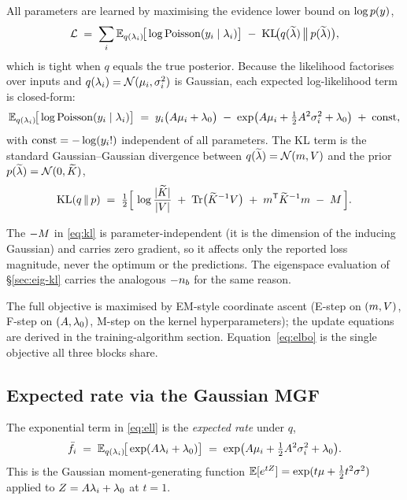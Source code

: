 All parameters are learned by maximising the evidence lower bound on
$\log p(y)$,
\begin{equation}
  \mathcal{L} \;=\; \sum_i \mathbb{E}_{q(\lambda_i)}\!\big[\log \mathrm{Poisson}(y_i\mid\lambda_i)\big]
    \;-\; \mathrm{KL}\!\big(q(\widetilde{\lambda})\,\big\|\,p(\widetilde{\lambda})\big),
  \label{eq:elbo}
\end{equation}
which is tight when $q$ equals the true posterior. Because the likelihood
factorises over inputs and $q(\lambda_i)=\mathcal{N}(\mu_i,\sigma^{2}_i)$ is Gaussian, each
expected log-likelihood term is closed-form:
\begin{equation}
  \mathbb{E}_{q(\lambda_i)}\!\big[\log \mathrm{Poisson}(y_i\mid\lambda_i)\big]
    \;=\; y_i\big(A\mu_i+\lambda_{0}\big)
      \;-\; \exp\!\big(A\mu_i+\tfrac12A^2\sigma^{2}_i+\lambda_{0}\big)
      \;+\; \text{const},
  \label{eq:ell}
\end{equation}
with $\text{const}=-\log(y_i!)$ independent of all parameters. The KL term is
the standard Gaussian--Gaussian divergence between $q(\widetilde{\lambda})=\mathcal{N}(m,V)$ and
the prior $p(\widetilde{\lambda})=\mathcal{N}(0,\widetilde{K})$,
\begin{equation}
  \mathrm{KL}(q\,\|\,p) \;=\; \tfrac12\Big[\,
    \log\frac{\lvert\widetilde{K}\rvert}{\lvert V\rvert}
    \;+\; \operatorname{Tr}\!\big(\widetilde{K}^{-1}V\big)
    \;+\; m^{\mathsf{T}}\widetilde{K}^{-1}m
    \;-\; M \,\Big].
  \label{eq:kl}
\end{equation}

\begin{remark}
The $-M$ in \eqref{eq:kl} is parameter-independent (it is the dimension of
the inducing Gaussian) and carries zero gradient, so it affects only the reported
loss magnitude, never the optimum or the predictions. The eigenspace evaluation
of \S\ref{sec:eig-kl} carries the analogous $-n_{b}$ for the same reason.
\end{remark}

The full objective is maximised by EM-style coordinate ascent
(E-step on $(m,V)$, F-step on $(A,\lambda_{0})$, M-step on the kernel
hyperparameters); the update equations are derived in the training-algorithm
section. Equation~\eqref{eq:elbo} is the single objective all three blocks share.

\subsection{Expected rate via the Gaussian MGF}\label{sec:fbar}

The exponential term in \eqref{eq:ell} is the \emph{expected rate} under $q$,
\begin{equation}
  \bar{f}_i \;=\; \mathbb{E}_{q(\lambda_i)}\!\big[\exp(A\lambda_i+\lambda_{0})\big]
    \;=\; \exp\!\big(A\mu_i+\tfrac12A^2\sigma^{2}_i+\lambda_{0}\big).
  \label{eq:fbar}
\end{equation}
This is the Gaussian moment-generating function
$\mathbb{E}[e^{tZ}]=\exp(t\mu+\tfrac12 t^2\sigma^2)$ applied to $Z=A\lambda_i+\lambda_{0}$ at
$t=1$.

